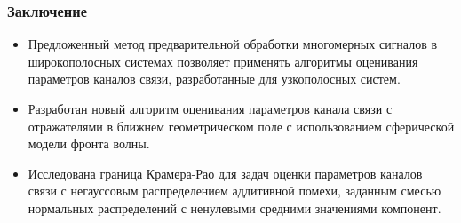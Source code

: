 \begin{frame}
	\frametitle{Заключение}
	\begin{itemize}
		\item Предложенный метод предварительной обработки многомерных сигналов в широкополосных системах позволяет применять алгоритмы оценивания параметров каналов связи, разработанные для узкополосных систем.
		\item Разработан новый алгоритм оценивания параметров канала связи с отражателями в ближнем геометрическом поле с использованием сферической модели фронта волны.
		\item Исследована граница Крамера-Рао для задач оценки параметров каналов связи с негауссовым распределением аддитивной помехи, заданным смесью нормальных распределений с ненулевыми средними значениями компонент.
	\end{itemize}
\end{frame}

